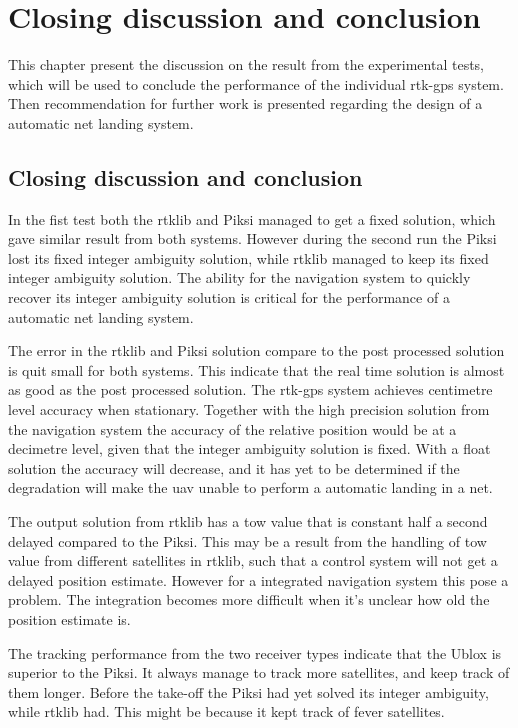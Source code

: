 
\chapter{Closing discussion and conclusion}
This chapter present the discussion on the result from the experimental tests, which will be used to conclude the performance of the individual \gls{rtk-gps} system. Then recommendation for further work is presented regarding the design of a automatic net landing system.
\section{Closing discussion and conclusion}
In the fist test both the \gls{rtklib} and Piksi managed to get a fixed solution, which gave similar result from both systems. However during the second run the Piksi lost its fixed integer ambiguity solution, while \gls{rtklib} managed to keep its fixed integer ambiguity solution. The ability for the navigation system to quickly recover its integer ambiguity solution is critical for the performance of a automatic net landing system.

The error in the \gls{rtklib} and Piksi solution compare to the post processed solution is quit small for both systems. This indicate that the real time solution is almost as good as the post processed solution.
The \gls{rtk-gps} system achieves centimetre level accuracy when stationary. Together with the high precision solution from the navigation system the accuracy of the relative position would be at a decimetre level, given that the integer ambiguity solution is fixed. With a float solution the accuracy will decrease, and it has yet to be determined if the degradation will make the \gls{uav} unable to perform a automatic landing in a net.

The output solution from \gls{rtklib} has a \acrfull{tow} value that is constant half a second delayed compared to the Piksi. This may be a result from the handling of \gls{tow} value from different satellites in \gls{rtklib}, such that a control system will not get a delayed position estimate. However for a integrated navigation system this pose a problem. The integration becomes more difficult when it's unclear how old the position estimate is.

The tracking performance from the two receiver types indicate that the Ublox is superior to the Piksi. It always manage to track more satellites, and keep track of them longer.
Before the take-off the Piksi had yet solved its integer ambiguity, while \gls{rtklib} had. This might be because it kept track of fever satellites.

